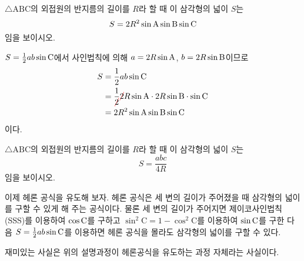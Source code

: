 \documentclass[11pt, a4paper]{book}
\begin{document}
\begin{example}
	$\triangle \textrm{ABC}$의 외접원의 반지름의 길이를 $R$라 할 때 이 삼각형의 넓이 $S$는 
	\[
	S  =2R^{2} \sin \textrm{A} \sin \textrm{B}\sin \textrm{C}
	\]
	임을 보이시오.
	\begin{solution}
		$S=\frac{1}{2} ab \sin \textrm{C}$에서 사인법칙에 의해 $a =2R \sin \textrm{A}$, $b=2R \sin \textrm{B}$이므로 
		\begin{align*}
			S &=\frac{1}{2} a b \sinrm{C} \\
				&=\frac{1}{\Ccancel[red]{2}} \Ccancel[red]{2}R \sinrm{A} \cdot 2R \sinrm{B} \cdot \sinrm{C} \\
				& = 2R^{2} \sinrm{A}\sinrm{B}\sinrm{C}
			\end{align*}
		이다.
	\end{solution}
\end{example}
\vspace{1em}

\begin{problem}
	$\triangle \textrm{ABC}$의 외접원의 반지름의 길이를 $R$라 할 때 이 삼각형의 넓이 $S$는 
	\[
	S  = \frac{abc}{4R}
	\]
	임을 보이시오.
\end{problem}
\vspace{1em}
이제 헤론 공식을 유도해 보자. 헤론 공식은 세 변의 길이가 주어졌을 때 삼각형의 넓이를 구할 수 있게 해 주는 공식이다. 물론 세 변의 길이가 주어지면 제이코사인법칙(SSS)를 이용하여 $\cos \textrm{C}$를 구하고 $\sin^{2} \textrm{C} = 1 - \cos^{2}\textrm{C}$를 이용하여 $\sin \textrm{C}$를 구한 다음
$S =\frac{1}{2} ab \sin \textrm{C}$를 이용하면 헤론 공식을 몰라도 삼각형의 넓이를 구할 수 있다.
  
  재미있는 사실은 위의 설명과정이 헤론공식을 유도하는 과정 자체라는 사실이다. 
  
\end{document}
